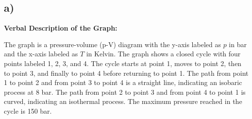 

\subsection*{a)}

\textbf{Verbal Description of the Graph:}

The graph is a pressure-volume (p-V) diagram with the y-axis labeled as \( p \) in bar and the x-axis labeled as \( T \) in Kelvin. The graph shows a closed cycle with four points labeled 1, 2, 3, and 4. The cycle starts at point 1, moves to point 2, then to point 3, and finally to point 4 before returning to point 1. The path from point 1 to point 2 and from point 3 to point 4 is a straight line, indicating an isobaric process at 8 bar. The path from point 2 to point 3 and from point 4 to point 1 is curved, indicating an isothermal process. The maximum pressure reached in the cycle is 150 bar.